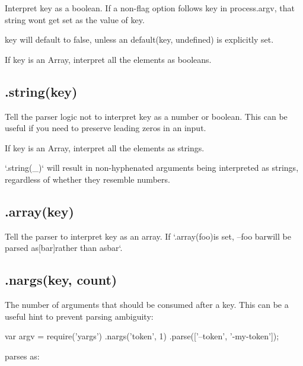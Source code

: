 Interpret {\ttfamily key} as a boolean. If a non-\/flag option follows {\ttfamily key} in {\ttfamily process.\+argv}, that string won\textquotesingle{}t get set as the value of {\ttfamily key}.

{\ttfamily key} will default to {\ttfamily false}, unless an {\ttfamily default(key, undefined)} is explicitly set.

If {\ttfamily key} is an Array, interpret all the elements as booleans.

\subsection*{.string(key) }

Tell the parser logic not to interpret {\ttfamily key} as a number or boolean. This can be useful if you need to preserve leading zeros in an input.

If {\ttfamily key} is an Array, interpret all the elements as strings.

`.string(\textquotesingle{}\+\_\+\textquotesingle{})` will result in non-\/hyphenated arguments being interpreted as strings, regardless of whether they resemble numbers.

\subsection*{.array(key) }

Tell the parser to interpret {\ttfamily key} as an array. If `.array(\textquotesingle{}foo\textquotesingle{}){\ttfamily is set, }--foo bar{\ttfamily will be parsed as}\mbox{[}\textquotesingle{}bar\textquotesingle{}\mbox{]}{\ttfamily rather than as}\textquotesingle{}bar\textquotesingle{}`.

\subsection*{.nargs(key, count) }

The number of arguments that should be consumed after a key. This can be a useful hint to prevent parsing ambiguity\+:


\begin{DoxyCode}
var argv = require(\textcolor{stringliteral}{'yargs'})
  .nargs(\textcolor{stringliteral}{'token'}, 1)
  .parse([\textcolor{stringliteral}{'--token'}, \textcolor{stringliteral}{'-my-token'}]);
\end{DoxyCode}


parses as\+:


